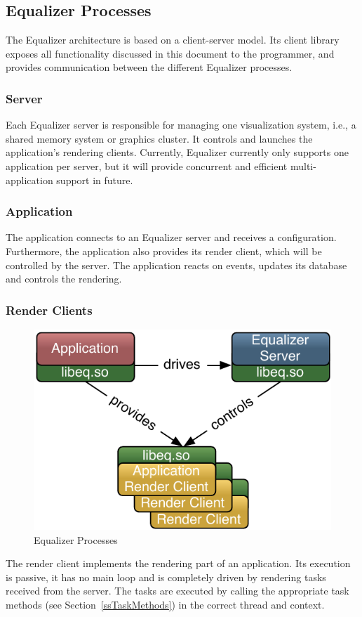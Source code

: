 \documentclass[10pt,a4]{scrartcl}
\newcommand{\sref}[1]{Section~\ref{#1}}
\begin{document}
\subsection{Equalizer Processes}

The Equalizer architecture is based on a client-server model. Its client
library exposes all functionality discussed in this document to the
programmer, and provides communication between the different Equalizer
processes.

\subsubsection{Server}
Each Equalizer server is responsible for managing one visualization
system, i.e., a shared memory system or graphics cluster.  It controls
and launches the application's rendering clients.  Currently, Equalizer
currently only supports one application per server, but it will provide
concurrent and efficient multi-application support in future.

\subsubsection{Application}

The application connects to an Equalizer server and receives a
configuration.  Furthermore, the application also provides its render
client, which will be controlled by the server. The application reacts
on events, updates its database and controls the rendering.

\subsubsection{Render Clients}

\begin{figure}
  \includegraphics[width=.4\textwidth]{images/processes.pdf}
  {\caption{\small\label{fProcesses}Equalizer Processes}}
\end{figure}
The render client implements the rendering part of an
application. Its execution is passive, it has no main loop and
is completely driven by rendering tasks received from the server. The
tasks are executed by calling the appropriate task methods (see
\sref{ssTaskMethods}) in the correct thread and context.
\end{document}
